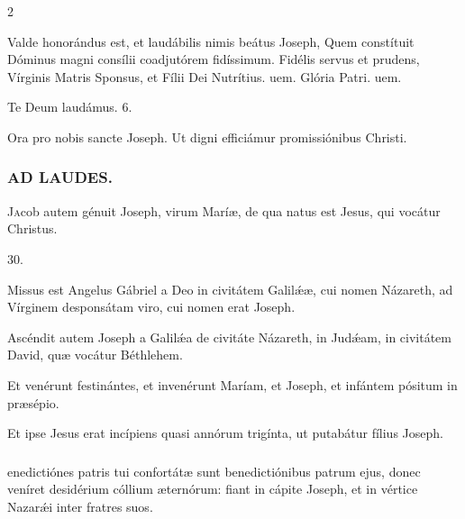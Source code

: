\documentclass[9pt,twoside]{extarticle}
\begin{document}
\begin{multicols}{2}
\begin{tightlist}{}
\item {} Valde honorándus est, et laudábilis nimis beátus Joseph, \textred{*} Quem constítuit Dóminus magni consílii coadjutórem fidíssimum.  Fidélis servus et prudens, Vírginis Matris Sponsus, et Fílii Dei Nutrítius. uem. Glória Patri. uem.
\item Te Deum laudámus. 6.
\item {} Ora pro nobis sancte Joseph.  Ut digni efficiámur promissiónibus Christi.
\end{tightlist}

\subsubsection*{\center \textsc{AD LAUDES.}}
\begin{center}\end{center}
\lettrine{J}acob autem génuit Joseph, virum Maríæ, de qua natus est Jesus, qui vocátur Christus.

\begin{tightlist}{}
\item {} 30.
\item {} Missus est Angelus Gábriel a Deo in civitátem Galilǽæ, cui nomen Názareth, ad Vírginem desponsátam viro, cui nomen erat Joseph.
\item {} Ascéndit autem Joseph a Galilǽa de civitáte Názareth, in Judǽam, in civitátem David, quæ vocátur Béthlehem.
\item {} Et venérunt festinántes, et invenérunt Maríam, et Joseph, et infántem pósitum in præsépio.
\item {} Et ipse Jesus erat incípiens quasi annórum trigínta, ut putabátur fílius Joseph.
\end{tightlist}

\subsubsection*{}
enedictiónes patris tui confortátæ sunt benedictiónibus patrum ejus, donec veníret desidérium cóllium æternórum: fiant in cápite Joseph, et in vértice Nazarǽi inter fratres suos.


\end{multicols}
\end{document}
